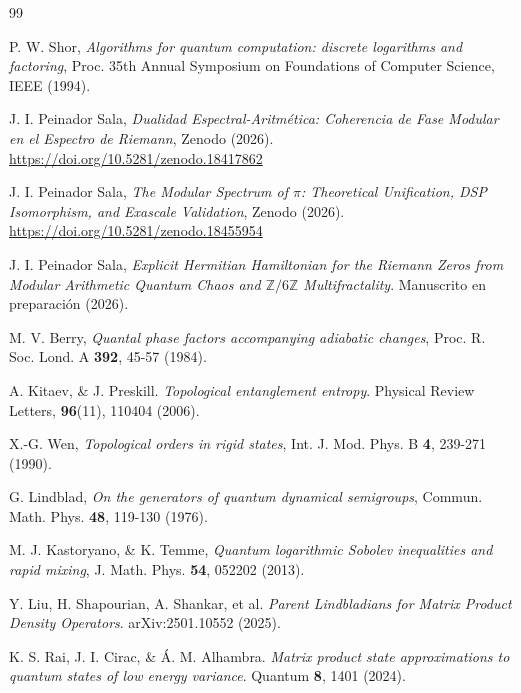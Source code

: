 \documentclass[12pt,a4paper]{article}
\theoremstyle{plain}
\theoremstyle{definition}
\theoremstyle{remark}
\begin{document}
\begin{thebibliography}{99}


P. W. Shor, \textit{Algorithms for quantum computation: discrete logarithms and factoring}, Proc. 35th Annual Symposium on Foundations of Computer Science, IEEE (1994).

J. I. Peinador Sala, \textit{Dualidad Espectral-Aritmética: Coherencia de Fase Modular en el Espectro de Riemann}, Zenodo (2026). \url{https://doi.org/10.5281/zenodo.18417862}

J. I. Peinador Sala, \textit{The Modular Spectrum of $\pi$: Theoretical Unification, DSP Isomorphism, and Exascale Validation}, Zenodo (2026). \url{https://doi.org/10.5281/zenodo.18455954}

J. I. Peinador Sala, \textit{Explicit Hermitian Hamiltonian for the Riemann Zeros from Modular Arithmetic Quantum Chaos and $\mathbb{Z}/6\mathbb{Z}$ Multifractality}. Manuscrito en preparación (2026).

M. V. Berry, \textit{Quantal phase factors accompanying adiabatic changes}, Proc. R. Soc. Lond. A \textbf{392}, 45-57 (1984).

A. Kitaev, \& J. Preskill. \textit{Topological entanglement entropy}. Physical Review Letters, \textbf{96}(11), 110404 (2006).

X.-G. Wen, \textit{Topological orders in rigid states}, Int. J. Mod. Phys. B \textbf{4}, 239-271 (1990).

G. Lindblad, \textit{On the generators of quantum dynamical semigroups}, Commun. Math. Phys. \textbf{48}, 119-130 (1976).

M. J. Kastoryano, \& K. Temme, \textit{Quantum logarithmic Sobolev inequalities and rapid mixing}, J. Math. Phys. \textbf{54}, 052202 (2013).

Y. Liu, H. Shapourian, A. Shankar, et al. \textit{Parent Lindbladians for Matrix Product Density Operators}. arXiv:2501.10552 (2025).

K. S. Rai, J. I. Cirac, \& Á. M. Alhambra. \textit{Matrix product state approximations to quantum states of low energy variance}. Quantum \textbf{8}, 1401 (2024).


\end{thebibliography}
\end{document}

